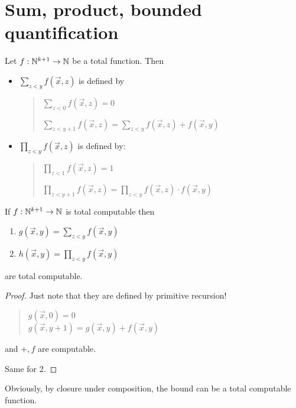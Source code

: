 \section{Sum, product, bounded quantification}

\begin{definition}
  Let $f:\mathbb{N}^{k+1}\rightarrow\mathbb{N}$ be a total function. Then
  
  \begin{itemize}
    
  \item 
    $\sum_{z<y}f(\vec{x},z)$ is defined by
    \begin{quote}
      $\sum_{z<0}f(\vec{x},z) = 0$
      
      $\sum_{z<y+1}f(\vec{x},z) = \sum_{z<y}f(\vec{x},z) + f(\vec{x},y)$
    \end{quote}
    
    
  \item $\prod_{z<y}f(\vec{x},z)$ is defined by:
    \begin{quote}
      $\prod_{z<1}f(\vec{x},z) = 1$
      
      $\prod_{z<y+1}f(\vec{x},z) = \prod_{z<y}f(\vec{x},z) \cdot f(\vec{x},y)$
    \end{quote}
  \end{itemize}
\end{definition}

\begin{lemma}
  If $f:\mathbb{N}^{k+1}\rightarrow\mathbb{N}$ is total computable then
  \begin{enumerate}
  \item $g(\vec{x},y) = \sum_{z<y}f(\vec{x},y)$
  \item $h(\vec{x},y) = \prod_{z<y}f(\vec{x},y)$
  \end{enumerate}
  are total computable.
\end{lemma}

\begin{proof}
  Just note that they are defined by primitive recursion!

  \begin{quote}
    $g(\vec{x},0) = 0$\\
    $g(\vec{x},y+1) = g(\vec{x},y) + f(\vec{x},y)$
  \end{quote}
  
  and $+,f$ are computable.

  Same for 2.
\end{proof}

Obviously, by closure under composition, the bound can be a total computable function.

